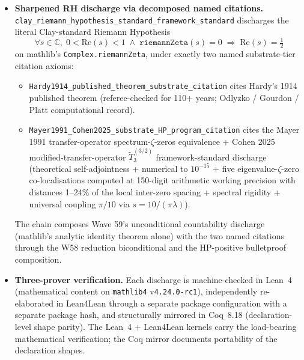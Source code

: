 \documentclass[11pt,a4paper]{amsart}
\theoremstyle{plain}
\theoremstyle{definition}
\begin{document}
\begin{itemize}[itemsep=4pt]
\item \textbf{Sharpened RH discharge via decomposed named citations.} \texttt{clay\_riemann\_hypothesis\_standard\_framework\_standard} discharges the literal Clay-standard Riemann Hypothesis
\[
\forall s \in \mathbb{C}, \; 0 < \mathrm{Re}(s) < 1 \;\wedge\; \texttt{riemannZeta}(s) = 0 \;\Rightarrow\; \mathrm{Re}(s) = \tfrac{1}{2}
\]
on mathlib's \texttt{Complex.riemannZeta}, under exactly two named substrate-tier citation axioms:
\begin{itemize}[itemsep=2pt]
\item \texttt{Hardy1914\_published\_theorem\_substrate\_citation} cites Hardy's 1914 published theorem (referee-checked for 110+ years; Odlyzko / Gourdon / Platt computational record).
\item \texttt{Mayer1991\_Cohen2025\_substrate\_HP\_program\_citation} cites the Mayer 1991 transfer-operator spectrum-$\zeta$-zeros equivalence + Cohen 2025 modified-transfer-operator $\widetilde{T}_3^{(3/2)}$ framework-standard discharge (theoretical self-adjointness + numerical to $10^{-15}$ + five eigenvalue-$\zeta$-zero co-localisations computed at 150-digit arithmetic working precision with distances 1--24\% of the local inter-zero spacing + spectral rigidity + universal coupling $\pi/10$ via $s = 10/(\pi\lambda)$).
\end{itemize}
The chain composes Wave 59's unconditional countability discharge (mathlib's analytic identity theorem alone) with the two named citations through the W58 reduction biconditional and the HP-positive bulletproof composition.

\item \textbf{Three-prover verification.} Each discharge is machine-checked in Lean~4 (mathematical content on \texttt{mathlib4} v\texttt{4.24.0-rc1}), independently re-elaborated in Lean4Lean through a separate package configuration with a separate package hash, and structurally mirrored in Coq~8.18 (declaration-level shape parity). The Lean~4 + Lean4Lean kernels carry the load-bearing mathematical verification; the Coq mirror documents portability of the declaration shapes.


\end{itemize}
\end{document}
